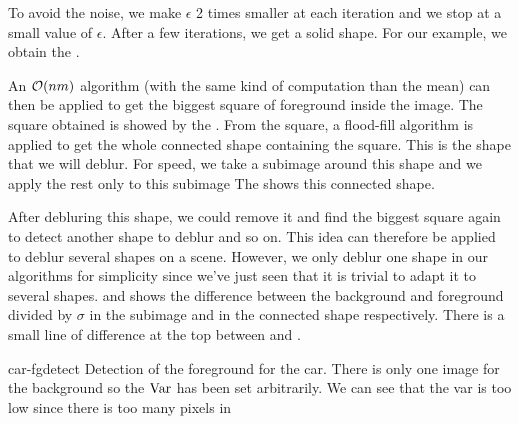To avoid the noise, we make $\epsilon$ 2 times smaller at each iteration and we stop at a small value of $\epsilon$.
After a few iterations, we get a solid shape.
For our example, we obtain the .

An $\mathcal{O}(nm)$ algorithm (with the same kind of computation than the mean) can then be applied to get the biggest square of foreground inside the image.
The square obtained is showed by the .
From the square, a flood-fill algorithm is applied to get the whole connected shape containing the square.
This is the shape that we will deblur.
For speed, we take a subimage around this shape and we apply the rest only to this subimage
The  shows this connected shape.

After debluring this shape, we could remove it and find the biggest square again to detect another shape to deblur and so on.
This idea can therefore be applied to deblur several shapes on a scene.
However, we only deblur one shape in our algorithms for simplicity
since we've just seen that it is trivial to adapt it to several shapes.
 and  shows the
difference between the background and foreground divided by $\sigma$
in the subimage and in the connected shape respectively.
There is a small line of difference at the top between
 and .

\begin{myfig}{car-fgdetect}
  {Detection of the foreground for the car.
    There is only one image for the background so the $\operatorname{Var}$ has been set arbitrarily.
  We can see that the var is too low since there is too many pixels in }
\end{myfig}
